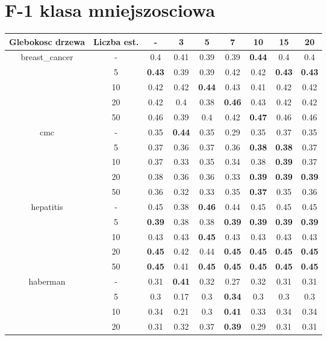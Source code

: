 \documentclass{article}%
\begin{document}
%
\section*{F{-}1 klasa mniejszosciowa}%
\begin{tabular}{c|c|ccccccc}%
\hline%
Glebokosc drzewa&Liczba est.&{-}&3&5&7&10&15&20\\%
\hline%
\multirow{5}{*}{breast\_cancer}&{-}&0.4&0.41&0.39&0.39&\textbf{0.44}&0.4&0.4\\%
\cline{2%
-%
9}%
&5&\textbf{0.43}&0.39&0.39&0.42&0.42&\textbf{0.43}&\textbf{0.43}\\%
\cline{2%
-%
9}%
&10&0.42&0.42&\textbf{0.44}&0.43&0.41&0.42&0.42\\%
\cline{2%
-%
9}%
&20&0.42&0.4&0.38&\textbf{0.46}&0.43&0.42&0.42\\%
\cline{2%
-%
9}%
&50&0.46&0.39&0.4&0.42&\textbf{0.47}&0.46&0.46\\%
\hline%
\multirow{5}{*}{cmc}&{-}&0.35&\textbf{0.44}&0.35&0.29&0.35&0.37&0.35\\%
\cline{2%
-%
9}%
&5&0.37&0.36&0.37&0.36&\textbf{0.38}&\textbf{0.38}&0.37\\%
\cline{2%
-%
9}%
&10&0.37&0.33&0.35&0.34&0.38&\textbf{0.39}&0.37\\%
\cline{2%
-%
9}%
&20&0.38&0.36&0.36&0.33&\textbf{0.39}&\textbf{0.39}&\textbf{0.39}\\%
\cline{2%
-%
9}%
&50&0.36&0.32&0.33&0.35&\textbf{0.37}&0.35&0.36\\%
\hline%
\multirow{5}{*}{hepatitis}&{-}&0.45&0.38&\textbf{0.46}&0.44&0.45&0.45&0.45\\%
\cline{2%
-%
9}%
&5&\textbf{0.39}&0.38&0.38&\textbf{0.39}&\textbf{0.39}&\textbf{0.39}&\textbf{0.39}\\%
\cline{2%
-%
9}%
&10&0.43&0.43&\textbf{0.45}&0.43&0.43&0.43&0.43\\%
\cline{2%
-%
9}%
&20&\textbf{0.45}&0.42&0.44&\textbf{0.45}&\textbf{0.45}&\textbf{0.45}&\textbf{0.45}\\%
\cline{2%
-%
9}%
&50&\textbf{0.45}&0.41&\textbf{0.45}&\textbf{0.45}&\textbf{0.45}&\textbf{0.45}&\textbf{0.45}\\%
\hline%
\multirow{5}{*}{haberman}&{-}&0.31&\textbf{0.41}&0.32&0.27&0.32&0.31&0.31\\%
\cline{2%
-%
9}%
&5&0.3&0.17&0.3&\textbf{0.34}&0.3&0.3&0.3\\%
\cline{2%
-%
9}%
&10&0.34&0.21&0.3&\textbf{0.41}&0.33&0.34&0.34\\%
\cline{2%
-%
9}%
&20&0.31&0.32&0.37&\textbf{0.39}&0.29&0.31&0.31\\%

\end{tabular}
\end{document}

